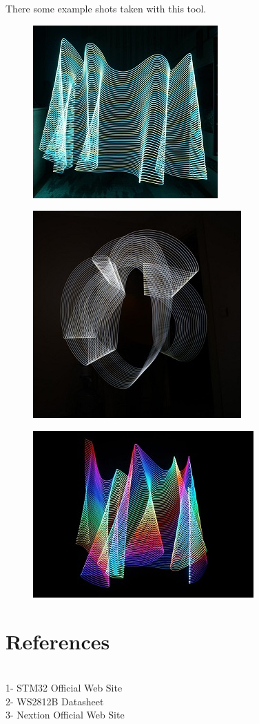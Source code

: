 \documentclass[conference]{IEEEtran}
\begin{document}
There some example shots taken with this tool.

\begin{figure}[htbp]
\centerline{\includegraphics{1.jpg}}
\label{fig}
\end{figure}

\begin{figure}[htbp]
\centerline{\includegraphics{2.jpg}}
\label{fig}
\end{figure}

\begin{figure}[htbp]
\centerline{\includegraphics{3.jpg}}
\label{fig}
\end{figure}

\newpage


\section{References}
\\
1- STM32 Official Web Site\\
2- WS2812B Datasheet\\
3- Nextion Official Web Site\\
\end{document}
